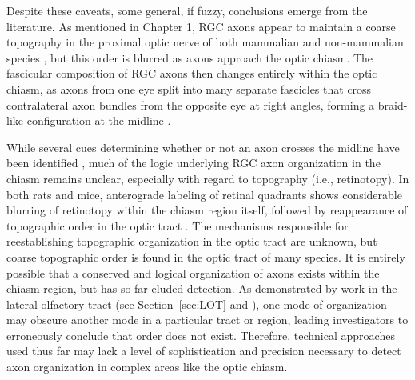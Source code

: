 Despite these caveats, some general, if fuzzy, conclusions emerge from the literature.
As mentioned in Chapter 1, RGC axons appear to maintain a coarse topography in the proximal optic nerve of both mammalian \cite{horton1979non,naito1986course,simon1991relationship,reese1993reestablishment,chan1994changes,naito1994retinogeniculate,chan1999changes,plas2005pretarget} and non-mammalian species \cite{ehrlich1984course,montgomery1998organization}, but this order is blurred as axons approach the optic chiasm.
The fascicular composition of RGC axons then changes entirely within the optic chiasm, as axons from one eye split into many separate fascicles that cross contralateral axon bundles from the opposite eye at right angles, forming a braid-like configuration at the midline \cite{colello1998changing}.

While several cues determining whether or not an axon crosses the midline have been identified \cite{erskine2014connecting}, much of the logic underlying RGC axon organization in the chiasm remains unclear, especially with regard to topography (i.e., retinotopy).
In both rats and mice, anterograde labeling of retinal quadrants shows considerable blurring of retinotopy within the chiasm region itself, followed by reappearance of topographic order in the optic tract \cite{chan1994changes,chan1999changes}.
The mechanisms responsible for reestablishing topographic organization in the optic tract are unknown, but coarse topographic order is found in the optic tract of many species.
It is entirely possible that a conserved and logical organization of axons exists within the chiasm region, but has so far eluded detection.
As demonstrated by work in the lateral olfactory tract (see Section~\ref{sec:LOT} and ), one mode of organization may obscure another mode in a particular tract or region, leading investigators to erroneously conclude that order does not exist.
Therefore, technical approaches used thus far may lack a level of sophistication and precision necessary to detect axon organization in complex areas like the optic chiasm.


